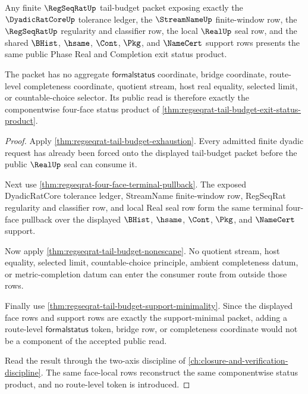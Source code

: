 \begin{theorem}
\label{thm:regseqrat-tail-budget-status-product-reverse}
Any finite $\RegSeqRatUp$ tail-budget packet exposing exactly the $\DyadicRatCoreUp$ tolerance ledger, the $\StreamNameUp$ finite-window row, the $\RegSeqRatUp$ regularity and classifier row, the local $\RealUp$ seal row, and the shared $\BHist$, $\hsame$, $\Cont$, $\Pkg$, and $\NameCert$ support rows presents the same public Phase Real and Completion exit status product.

The packet has no aggregate $\mathsf{formalstatus}$ coordinate, bridge coordinate, route-level completeness coordinate, quotient stream, host real equality, selected limit, or countable-choice selector. Its public read is therefore exactly the componentwise four-face status product of \autoref{thm:regseqrat-tail-budget-exit-status-product}.
\end{theorem}
\begin{proof}
Apply \autoref{thm:regseqrat-tail-budget-exhaustion}. Every admitted finite dyadic request has already been forced onto the displayed tail-budget packet before the public $\RealUp$ seal can consume it.

Next use \autoref{thm:regseqrat-four-face-terminal-pullback}. The exposed DyadicRatCore tolerance ledger, StreamName finite-window row, RegSeqRat regularity and classifier row, and local Real seal row form the same terminal four-face pullback over the displayed $\BHist$, $\hsame$, $\Cont$, $\Pkg$, and $\NameCert$ support.

Now apply \autoref{thm:regseqrat-tail-budget-nonescape}. No quotient stream, host equality, selected limit, countable-choice principle, ambient completeness datum, or metric-completion datum can enter the consumer route from outside those rows.

Finally use \autoref{thm:regseqrat-tail-budget-support-minimality}. Since the displayed face rows and support rows are exactly the support-minimal packet, adding a route-level $\mathsf{formalstatus}$ token, bridge row, or completeness coordinate would not be a component of the accepted public read.

Read the result through the two-axis discipline of \autoref{ch:closure-and-verification-discipline}. The same face-local rows reconstruct the same componentwise status product, and no route-level token is introduced.
\end{proof}

